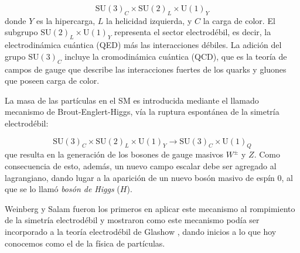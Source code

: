 \begin{equation}
  \text{SU}(3)_C \times \text{SU}(2)_L \times \text{U}(1)_Y
\end{equation}
%
donde $Y$ es la hipercarga, $L$ la helicidad izquierda, y $C$ la carga de color.
El subgrupo
$\text{SU}(2)_L \times \text{U}(1)_Y$ representa el sector electrodébil, es
decir, la electrodinámica cuántica (QED) más las interacciones débiles.
La adición del grupo $\text{SU}(3)_C$ incluye la cromodinámica cuántica (QCD), que
es la teoría de campos de gauge que describe las interacciones fuertes de los
quarks y gluones que poseen carga de color.

La masa de las partículas en el SM es introducida mediante el llamado mecanismo
de Brout-Englert-Higgs\cite{PhysRevLett.13.321,PhysRevLett.13.508}, vía la
ruptura espontánea de la simetría electrodébil:

\begin{equation}
  \text{SU}(3)_C \times \text{SU}(2)_L \times \text{U}(1)_Y \to \text{SU}(3)_C
  \times \text{U}(1)_Q
\end{equation}
%
que resulta en la generación de los bosones de gauge masivos $W^\pm$ y $Z$. Como
consecuencia de esto, además, un nuevo campo escalar debe ser agregado al
lagrangiano, dando lugar a la aparición de un nuevo bosón masivo de espín
0, al que se lo llamó \emph{bosón de Higgs} ($H$).

Weinberg y Salam fueron los primeros en aplicar este mecanismo al
rompimiento de la simetría electrodébil
\cite{PhysRevLett.19.1264,PhysRev.127.965} y mostraron como este mecanismo podía
ser incorporado a la teoría electrodébil de Glashow \cite{Glashow1961579}, dando
inicios a lo que hoy conocemos como el {\SM} de la física de partículas.

